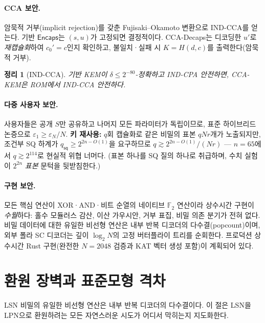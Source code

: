 \documentclass[11pt,a4paper]{article}
\theoremstyle{plain}
\newtheorem{theorem}{정리}[section]
\theoremstyle{definition}
\newcommand{\F}{\mathbb{F}}
\begin{document}
\paragraph{CCA 보안.} 암묵적 거부(implicit rejection)를 갖춘 Fujisaki--Okamoto 변환으로 IND-CCA를 얻는다. 기반 $\mathsf{Encaps}$는 $(s,u)$가 고정되면 결정적이다. CCA-Decaps는 디코딩한 $u'$로 \emph{재캡슐화}하여 $c_0' = c$인지 확인하고, 불일치·실패 시 $K = H(d,c)$를 출력한다(암묵적 거부).

\begin{theorem}[IND-CCA]
기반 KEM이 $\delta \le 2^{-80}$-정확하고 IND-CPA 안전하면, CCA-KEM은 ROM에서 IND-CCA 안전하다.
\end{theorem}

\paragraph{다중 사용자 보안.} 사용자들은 공개 $S$만 공유하고 나머지 모든 파라미터가 독립이므로, 표준 하이브리드 논증으로 $\varepsilon_1 \ge \varepsilon_N / N$. \textbf{키 재사용:} $q$회 캡슐화로 같은 비밀의 표본 $qNr$개가 노출되지만, 조건부 SQ 하계가 $q_{\mathsf{sq}} \ge 2^{2n-O(1)}$을 요구하므로 $q \gtrsim 2^{2n-O(1)}/(Nr)$ --- $n=65$에서 $q \gtrsim 2^{114}$로 현실적 위협 너머다. (표본 하나를 SQ 질의 하나로 취급하며, 수치 실험이 $2^{2n}$ \emph{표본} 문턱을 뒷받침한다.)

\paragraph{구현 보안.} 모든 핵심 연산이 XOR·AND·비트 순열의 네이티브 $\F_2$ 연산이라 상수시간 구현이 \emph{수월}하다: 홀수 모듈러스 감산, 이산 가우시안, 거부 표집, 비밀 의존 분기가 전혀 없다. 비밀 데이터에 대한 유일한 비선형 연산은 내부 반복 디코더의 다수결(popcount)이며, 외부 폴라 SC 디코더는 깊이 $\log_2 N$의 고정 버터플라이 트리를 순회한다. 프로덕션 상수시간 Rust 구현(완전한 $N=2048$ 검증과 KAT 벡터 생성 포함)이 계획되어 있다.


\section{환원 장벽과 표준모형 격차}
\label{sec:barriers-ko}

LSN 비밀의 유일한 비선형 연산은 내부 반복 디코더의 다수결이다. 이 절은 LSN을 LPN으로 환원하려는 모든 자연스러운 시도가 어디서 막히는지 지도화한다.
\end{document}
